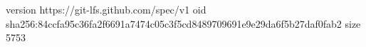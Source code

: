 version https://git-lfs.github.com/spec/v1
oid sha256:84ccfa95c36fa2f6691a7474c05c3f5cd8489709691e9e29da6f5b27daf0fab2
size 5753
